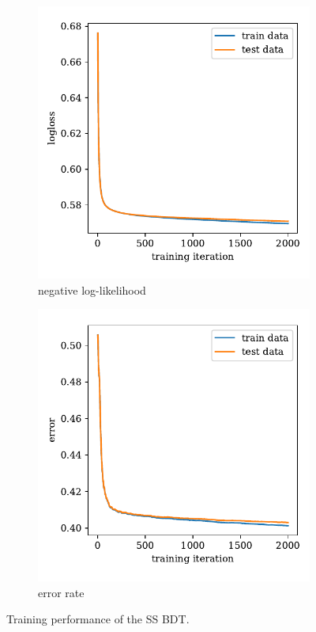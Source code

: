 \begin{figure}
    \centering
    \begin{subfigure}{0.5\textwidth}
        \centering
        \includegraphics[width=\textwidth]{images/SS_history_logloss.pdf}
        \caption{negative log-likelihood}
    \end{subfigure}%
    \begin{subfigure}{0.5\textwidth}
        \centering
        \includegraphics[width=\textwidth]{images/SS_history_error.pdf}
        \caption{error rate}
    \end{subfigure}%
    \caption{Training performance of the SS BDT.}
    \label{fig:SS_history}
\end{figure}

